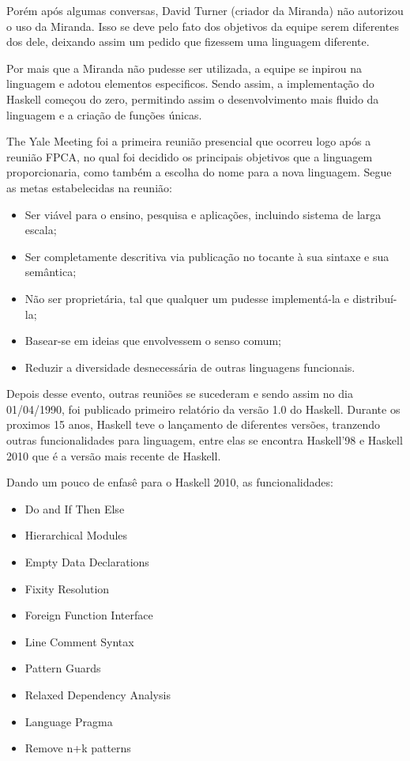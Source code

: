 \documentclass[
  article,			       %
  12pt,				         %
  oneside,			       %
  a4paper,			       %
  english,		       	 %
  brazil,			      	 %
  sumario=tradicional
]{abntex2}
\begin{document}
    Porém após algumas conversas, David Turner (criador da Miranda) não autorizou o uso da Miranda. Isso se deve pelo fato dos objetivos
    da equipe serem diferentes dos dele, deixando assim um pedido que fizessem uma linguagem diferente.

    Por mais que a Miranda não pudesse ser utilizada, a equipe se inpirou na linguagem e adotou elementos especificos.  
    Sendo assim, a implementação do Haskell começou do zero, permitindo assim o desenvolvimento mais fluido da linguagem 
    e a criação de funções únicas.
    
    The Yale Meeting foi a primeira reunião presencial que ocorreu logo após a reunião FPCA, no qual foi decidido
    os principais objetivos que a linguagem proporcionaria, como também a escolha do nome para a nova linguagem. 
    Segue as metas estabelecidas na reunião:

    \begin{itemize}
      \item Ser viável para o ensino, pesquisa e aplicações, incluindo sistema de larga escala;
      \item Ser completamente descritiva via publicação no tocante à sua sintaxe e sua semântica;
      \item Não ser proprietária, tal que qualquer um pudesse implementá-la e distribuí-la;
      \item Basear-se em ideias que envolvessem o senso comum;
      \item Reduzir a diversidade desnecessária de outras linguagens funcionais.
    \end{itemize}

    Depois desse evento, outras reuniões se sucederam e sendo assim no dia 01/04/1990, foi publicado primeiro relatório
    da versão 1.0 do Haskell. Durante os proximos 15 anos, Haskell teve o lançamento de diferentes versões, tranzendo outras
    funcionalidades para linguagem, entre elas se encontra Haskell'98 e Haskell 2010 que é a versão mais recente de Haskell.  

    Dando um pouco de enfasê para o Haskell 2010, as funcionalidades:
    
    \begin{itemize}
      \item Do and If Then Else 
      \item Hierarchical Modules
      \item Empty Data Declarations
      \item Fixity Resolution 
      \item Foreign Function Interface
      \item Line Comment Syntax
      \item Pattern Guards
      \item Relaxed Dependency Analysis
      \item Language Pragma
      \item Remove n+k patterns
    \end{itemize}
\end{document}
